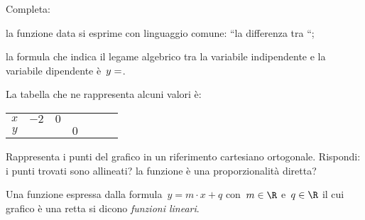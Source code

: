 Completa:
\begin{itemize*}
\item la funzione data si esprime con linguaggio comune: ``la differenza tra 
\dotfill``;
\item la formula che indica il legame algebrico tra la variabile indipendente 
e 
la variabile dipendente è~\(y=\dotfill\).
\end{itemize*}
La tabella che ne rappresenta alcuni valori è:
\begin{center}
 \begin{tabular}{ccccccc}
 \toprule
 \(x\) & \(-2\) & \(0\) & & & & \\
 \(y\) & & & \(0\) & & & \\
 \bottomrule
 \end{tabular}
\end{center}
Rappresenta i punti del grafico in un riferimento cartesiano ortogonale.
Rispondi: i punti trovati sono allineati? la funzione è una proporzionalità 
diretta?

\begin{definizione}
Una funzione espressa dalla formula~\(y=m\cdot x+q\) con~\(m\in \R\) 
e~\(q\in 
\R\) il cui grafico è una retta si dicono
\emph{funzioni lineari}.
\end{definizione}

